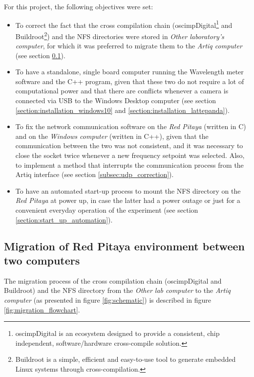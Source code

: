 \documentclass[a4paper,12pt]{article}
\begin{document}
For this project, the following objectives were set:
\begin{itemize}
\itemsep 0em %
    \item To correct the fact that the cross compilation chain (oscimpDigital\footnote{oscimpDigital is an ecosystem designed to provide a consistent, chip independent, software/hardware cross-compile solution.} and Buildroot\footnote{Buildroot is a simple, efficient and easy-to-use tool to generate embedded Linux systems through cross-compilation.}) and the NFS directories were stored in \textit{Other laboratory's computer}, for which it was preferred to migrate them to the \textit{Artiq computer} (see section \ref{section:migration_section}).
    \item To have a standalone, single board computer running the Wavelength meter software and the C++ program, given that these two do not require a lot of computational power and that there are conflicts whenever a camera is connected via USB to the Windows Desktop computer (see section \ref{section:installation_windows10} and \ref{section:installation_lattepanda}).
    \item To fix the network communication software on the \textit{Red Pitaya} (written in C) and on the \textit{Windows computer} (written in C++), given that the communication between the two was not consistent, and it was necessary to close the socket twice whenever a new frequency setpoint was selected. Also, to implement a method that interrupts the communication process from the Artiq interface (see section \ref{subsec:udp_correction}).
    \item To have an automated start-up process to mount the NFS directory on the \textit{Red Pitaya} at power up, in case the latter had a power outage or just for a convenient everyday operation of the experiment (see section \ref{section:start_up_automation}).
\end{itemize}

\subsection{Migration of Red Pitaya environment between two computers}
\label{section:migration_section}

The migration process of the cross compilation chain (oscimpDigital and Buildroot) and the
NFS directory from the \textit{Other lab computer} to the \textit{Artiq computer} (as presented in figure \ref{fig:schematic}) is described in figure \ref{fig:migration_flowchart}.
\end{document}
